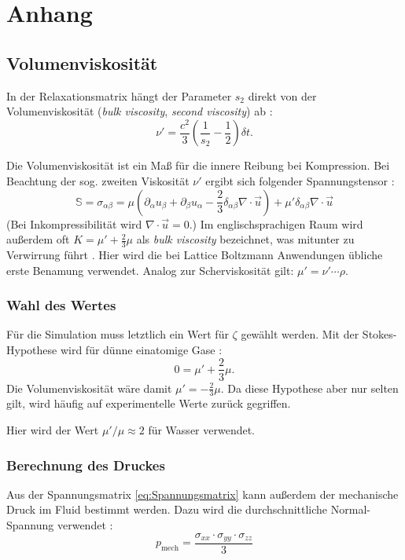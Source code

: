 \chapter{Anhang}
\section{Volumenviskosität}
In der Relaxationsmatrix hängt der Parameter $s_2$ direkt von der Volumenviskosität (\emph{bulk viscosity}, \emph{second viscosity}) ab \cite{Guo2013}:
\begin{equation}
 \nu' = \frac{c^2}{3} \left( \frac{1}{s_2} - \frac{1}{2} \right)  \delta t.
\end{equation}

Die Volumenviskosität ist ein Maß für die innere Reibung bei Kompression. 
Bei Beachtung der sog. zweiten Viskosität $\nu'$ ergibt sich folgender Spannungstensor \cite{Dellar2001}:
\begin{equation}
\label{eq:Spannungsmatrix}
 \mathbb{S} = \sigma_{\alpha \beta} = \mu \left( \partial_{\alpha} u_{\beta} + \partial_{\beta} u_{\alpha} - \frac{2}{3} \delta_{\alpha \beta} \nabla \cdot \vec{u} \right) + \mu' \delta_{\alpha \beta} \nabla \cdot \vec{u}
\end{equation}
(Bei Inkompressibilität wird $\nabla \cdot \vec{u} = 0$.)
Im englischsprachigen Raum wird außerdem oft $K = \mu' + \frac{2}{3} \mu$ als \emph{bulk viscosity} bezeichnet, was mitunter zu Verwirrung führt \cite{Rosenhead1954}.
Hier wird die bei Lattice Boltzmann Anwendungen übliche erste Benamung verwendet.
Analog zur Scherviskosität gilt: $\mu' = \nu' \cdots \rho$.

\subsection{Wahl des Wertes}
Für die Simulation muss letztlich ein Wert für $\zeta$ gewählt werden. 
Mit der Stokes-Hypothese wird für dünne einatomige Gase \cite{Graves1999}:
\begin{equation}
 0 = \mu' + \frac{2}{3} \mu.
\end{equation}
Die Volumenviskosität wäre damit $\mu' = - \frac{2}{3} \mu$. Da diese Hypothese aber nur selten gilt, wird häufig auf experimentelle Werte zurück gegriffen.

Hier wird der Wert $\mu' / \mu \approx 2$ für Wasser \cite{Rosenhead1954} verwendet.

\subsection{Berechnung des Druckes}
Aus der Spannungsmatrix \eqref{eq:Spannungsmatrix} kann außerdem der mechanische Druck im Fluid bestimmt werden.
Dazu wird die durchschnittliche Normal-Spannung verwendet \cite{Graves1999}:
\begin{equation}
 p_{\text{mech}} = \frac{\sigma_{xx} \cdot \sigma_{yy} \cdot \sigma_{zz}}{3}
\end{equation}

